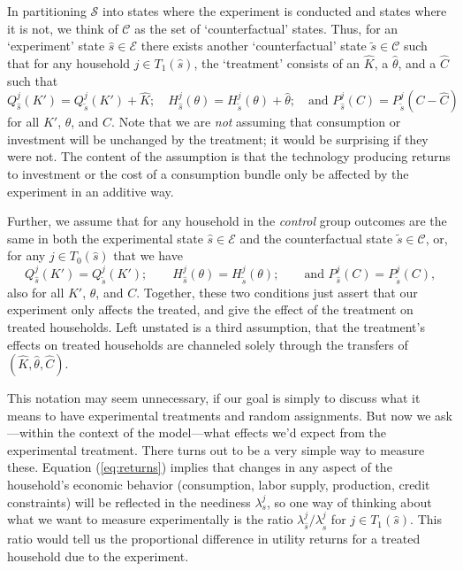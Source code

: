 \documentclass[12pt,letterpaper]{article}
\newcommand{\Eq}[1]{(\ref{eq:#1})}
\begin{document}
In partitioning \(\mathcal{S}\) into states where the experiment is
conducted and states where it is not, we think of \(\mathcal{C}\) as the
set of `counterfactual' states.  Thus, for an `experiment' state \(\hat
s\in\mathcal{E}\) there exists another `counterfactual' state \(\tilde s\in\mathcal{C}\)
such that for any household \(j\in T_1(\hat s)\), the `treatment'
consists of an \(\hat K\), a \(\hat\theta\), and a \(\hat C\) such that
\begin{equation}
\label{eq:treatment_counterfactual}
   Q^j_{\hat s}(K') =    Q^j_{\tilde s}(K') + \hat K; \quad
   H^j_{\hat s}(\theta) = H^j_{\tilde s}(\theta) + \hat\theta;\quad
   \text{and $P^j_{\hat s}(C) = P^j_{\tilde s}(C-\hat C)$}
\end{equation}
for all \(K'\), \(\theta\), and \(C\). Note that we are \emph{not} assuming
that consumption or investment will be unchanged by the treatment; it
would be surprising if they were not.  The content of the assumption
is that the technology producing returns to investment or the cost of
a consumption bundle only be affected by the experiment in an additive
way.  

Further, we assume that for any household in the \emph{control} group
outcomes are the same in both the experimental state \(\hat
s\in\mathcal{E}\) and the counterfactual state \(\tilde
s\in\mathcal{C}\), or, for any \(j\in T_0(\hat s)\) that we have
\begin{equation}
\label{eq:control_counterfactual}
   Q^j_{\hat s}(K') =    Q^j_{\tilde s}(K'); \qquad
   H^j_{\hat s}(\theta) = H^j_{\tilde s}(\theta);\qquad
   \text{and $P^j_{\hat s}(C) = P^j_{\tilde s}(C)$,}
\end{equation}
also for all \(K'\), \(\theta\), and \(C\).  Together, these two conditions
just assert that our experiment only affects the treated, and give the
effect of the treatment on treated households.  Left unstated is a
third assumption, that the treatment's effects on treated households
are channeled solely through the transfers of \((\hat K,\hat\theta,\hat
C)\).



This notation may seem unnecessary, if our goal is simply to discuss
what it means to have experimental treatments and random assignments.
But now we ask---within the context of the model---what effects we'd
expect from the experimental treatment.  There turns out to be a very
simple way to measure these.  Equation \Eq{returns} implies that
changes in any aspect of the household's economic behavior
(consumption, labor supply, production, credit constraints) will be
reflected in the neediness \(\lambda^j_s\), so one way of thinking about
what we want to measure experimentally is the ratio \(\lambda^j_{\hat
s}/\lambda^j_{\tilde s}\) for \(j\in T_1(\hat s)\).  This ratio would
tell us the proportional difference in utility returns for a treated
household due to the experiment.
\end{document}
